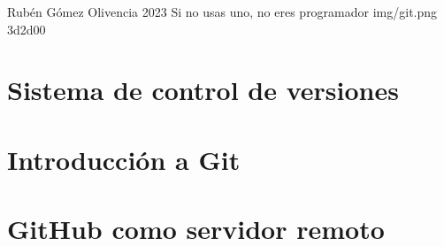 \documentclass{\ClassPath/yukibook}
\begin{document}
    {Rubén Gómez Olivencia}  %
    {2023}    %
    {} %
    {Si no usas uno, no eres programador} %
    {} %
    {img/git.png} %
    {3d2d00}
    {} %

        \coverpage
        \graphicspath{{../../yukibook.cls/}}
        \licensepage
        \tableofcontents

    \graphicspath{{img/}}
    \part{Sistema de control de versiones}
    
    \part{Introducción a Git}
    

    \part{GitHub como servidor remoto}
    

\end{document}
